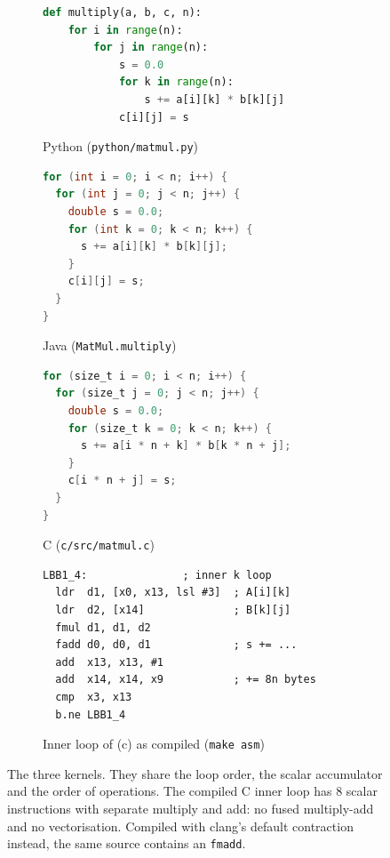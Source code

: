 \documentclass[11pt,a4paper]{article}
\begin{document}
\begin{figure}[t]
\centering
\begin{subfigure}[t]{0.48\linewidth}
\begin{lstlisting}[language=Python]
def multiply(a, b, c, n):
    for i in range(n):
        for j in range(n):
            s = 0.0
            for k in range(n):
                s += a[i][k] * b[k][j]
            c[i][j] = s
\end{lstlisting}
\caption{Python (\texttt{python/matmul.py})}
\end{subfigure}\hfill
\begin{subfigure}[t]{0.48\linewidth}
\begin{lstlisting}[language=Java]
for (int i = 0; i < n; i++) {
  for (int j = 0; j < n; j++) {
    double s = 0.0;
    for (int k = 0; k < n; k++) {
      s += a[i][k] * b[k][j];
    }
    c[i][j] = s;
  }
}
\end{lstlisting}
\caption{Java (\texttt{MatMul.multiply})}
\end{subfigure}

\medskip
\begin{subfigure}[t]{0.48\linewidth}
\begin{lstlisting}[language=C]
for (size_t i = 0; i < n; i++) {
  for (size_t j = 0; j < n; j++) {
    double s = 0.0;
    for (size_t k = 0; k < n; k++) {
      s += a[i * n + k] * b[k * n + j];
    }
    c[i * n + j] = s;
  }
}
\end{lstlisting}
\caption{C (\texttt{c/src/matmul.c})}
\end{subfigure}\hfill
\begin{subfigure}[t]{0.48\linewidth}
\begin{lstlisting}
LBB1_4:               ; inner k loop
  ldr  d1, [x0, x13, lsl #3]  ; A[i][k]
  ldr  d2, [x14]              ; B[k][j]
  fmul d1, d1, d2
  fadd d0, d0, d1             ; s += ...
  add  x13, x13, #1
  add  x14, x14, x9           ; += 8n bytes
  cmp  x3, x13
  b.ne LBB1_4
\end{lstlisting}
\caption{Inner loop of (c) as compiled (\texttt{make asm})}
\end{subfigure}
\caption{The three kernels. They share the loop order, the scalar accumulator
and the order of operations. The compiled C inner loop has 8 scalar
instructions with separate multiply and add: no fused multiply-add and no
vectorisation. Compiled with clang's default contraction instead, the same
source contains an \texttt{fmadd}.}
\label{fig:kernels}
\end{figure}
\end{document}
